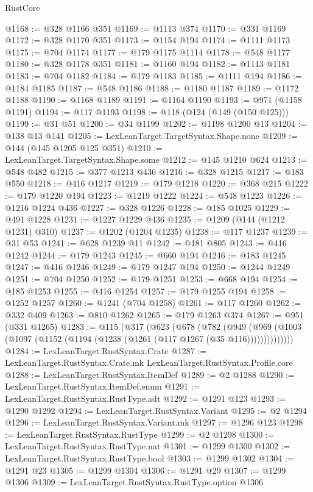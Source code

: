 \begin{lexlean}{RustCore}
\begin{coremodule}
@1168 := @328 @1166 @351
@1169 := @1113 @374
@1170 := @331 @1169
@1172 := @328 @1170 @351
@1173 := @1154 @194
@1174 := @1111 @1173
@1175 := @704 @1174
@1177 := @179 @1175 @1114
@1178 := @548 @1177
@1180 := @328 @1178 @351
@1181 := @1160 @194
@1182 := @1113 @1181
@1183 := @704 @1182
@1184 := @179 @1183
@1185 := @1111 @194
@1186 := @1184 @1185
@1187 := @548 @1186
@1188 := @1180 @1187
@1189 := @1172 @1188
@1190 := @1168 @1189
@1191 := @1164 @1190
@1193 := @971 (@1158 @1191)
@1194 := @117 @1193
@1198 := @118 (@124 (@149 (@150 @125)))
@1199 := @31 @51
@1200 := @34 @1199
@1202 := @1198 @1200 @13
@1204 := @138 @13 @141
@1205 := LexLeanTarget.TargetSyntax.Shape.none
@1209 := @144 (@145 @1205 @125 @351)
@1210 := LexLeanTarget.TargetSyntax.Shape.some
@1212 := @145 @1210 @624
@1213 := @548 @482
@1215 := @377 @1213 @436
@1216 := @328 @1215
@1217 := @183 @550
@1218 := @416 @1217
@1219 := @179 @1218
@1220 := @368 @215
@1222 := @179 @1220 @194
@1223 := @1219 @1222
@1224 := @548 @1223
@1226 := @1216 @1224 @436
@1227 := @328 @1226
@1228 := @185 @1025
@1229 := @491 @1228
@1231 := @1227 @1229 @436
@1235 := @1209 (@144 (@1212 @1231) @310)
@1237 := @1202 (@1204 @1235)
@1238 := @117 @1237
@1239 := @31 @53
@1241 := @628 @1239 @11
@1242 := @181 @805
@1243 := @416 @1242
@1244 := @179 @1243
@1245 := @660 @194
@1246 := @183 @1245
@1247 := @416 @1246
@1249 := @179 @1247 @194
@1250 := @1244 @1249
@1251 := @704 @1250
@1252 := @179 @1251
@1253 := @668 @194
@1254 := @185 @1253
@1255 := @416 @1254
@1257 := @179 @1255 @194
@1258 := @1252 @1257
@1260 := @1241 (@704 @1258)
@1261 := @117 @1260
@1262 := @332 @409
@1263 := @810 @1262
@1265 := @179 @1263 @374
@1267 := @951 (@331 @1265)
@1283 := @115
    (@317
      (@623
        (@678
          (@782
            (@949
              (@969 (@1003 (@1097 (@1152 (@1194 (@1238 (@1261 (@117 @1267 (@35 @116))))))))))))))
@1284 := LexLeanTarget.RustSyntax.Crate
@1287 := LexLeanTarget.RustSyntax.Crate.mk LexLeanTarget.RustSyntax.Profile.core
@1288 := LexLeanTarget.RustSyntax.ItemDef
@1289 := @2 @1288
@1290 := LexLeanTarget.RustSyntax.ItemDef.enum
@1291 := LexLeanTarget.RustSyntax.RustType.adt
@1292 := @1291 @123
@1293 := @1290 @1292
@1294 := LexLeanTarget.RustSyntax.Variant
@1295 := @2 @1294
@1296 := LexLeanTarget.RustSyntax.Variant.mk
@1297 := @1296 @123
@1298 := LexLeanTarget.RustSyntax.RustType
@1299 := @2 @1298
@1300 := LexLeanTarget.RustSyntax.RustType.nat
@1301 := @1299 @1300
@1302 := LexLeanTarget.RustSyntax.RustType.bool
@1303 := @1299 @1302
@1304 := @1291 @23
@1305 := @1299 @1304
@1306 := @1291 @29
@1307 := @1299 @1306
@1309 := LexLeanTarget.RustSyntax.RustType.option @1306

\end{coremodule}
\end{lexlean}
